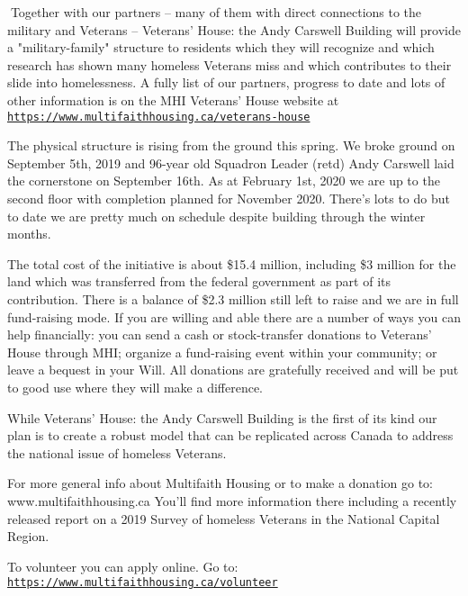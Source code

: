 Together with our partners – many of them with direct connections to
the military and Veterans – Veterans' House: the Andy Carswell Building
will provide a "military-family" structure to residents which they will
recognize and which research has shown many homeless Veterans miss and
which contributes to their slide into homelessness. A fully list of our
partners, progress to date and lots of other information is on the MHI
Veterans' House website at
{\normalfont\color{blue}\texttt{\url{https://www.multifaithhousing.ca/veterans-house}}}


The physical structure is rising from the ground this spring. We broke
ground on September 5th, 2019 and 96-year old Squadron Leader (retd)
Andy Carswell laid the cornerstone on September 16th. As at February
1st, 2020 we are up to the second floor with completion planned for
November 2020. There's lots to do but to date we are pretty much on
schedule despite building through the winter months.

The total cost of the initiative is about \$15.4 million, including \$3
million for the land which was transferred from the federal government
as part of its contribution. There is a balance of \$2.3 million still
left to raise and we are in full fund-raising mode. If you are willing
and able there are a number of ways you can help financially: you can
send a cash or stock-transfer donations to Veterans' House through MHI;
organize a fund-raising event within your community; or leave a bequest
in your Will. All donations are gratefully received and will be put to
good use where they will make a difference.

While Veterans' House: the Andy Carswell Building is the first of its
kind our plan is to create a robust model that can be replicated across
Canada to address the national issue of homeless Veterans.

For more general info about Multifaith Housing or to make a donation go
to: www.multifaithhousing.ca You'll find more information there
including a recently released report on a 2019 Survey of homeless
Veterans in the National Capital Region.

To volunteer you can apply online. Go to:
{\normalfont\color{blue}\texttt{\url{https://www.multifaithhousing.ca/volunteer}}}

